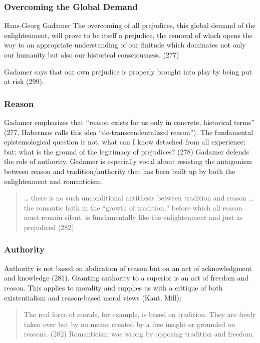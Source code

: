 \documentclass[xcolor=dvipsnames]{beamer}
\begin{document}
\begin{frame}
  \frametitle{Overcoming the Global Demand}
  \begin{block}{Hans-Georg Gadamer}
    The overcoming of all prejudices, this global demand of the
    enlightenment, will prove to be itself a prejudice, the removal of
    which opens the way to an appropriate understanding of our
    finitude which dominates not only our humanity but also our
    historical consciousness. (277)
  \end{block}
Gadamer says that our own prejudice is properly brought into play by
being put at risk (299).
\end{frame}

\begin{frame}
  \frametitle{Reason}
  Gadamer emphasizes that ``reason exists for us only in concrete,
  historical terms'' (277, Habermas calls this idea
  ``de-transcendentalized reason''). The fundamental epistemological
  question is not, what can I know detached from all experience; but:
  what is the ground of the legitimacy of prejudices? (278) Gadamer
  defends the role of authority. Gadamer is especially vocal about
  resisting the antagonism between reason and tradition/authority that
  has been built up by both the enlightenment and romanticism.
  \begin{quote}
    {\ldots} there is no such unconditional antithesis between
    tradition and reason {\ldots} the romantic faith in the ``growth
    of tradition,'' before which all reason must remain silent, is
    fundamentally like the enlightenment and just as prejudiced (282)
  \end{quote}
\end{frame}

\begin{frame}
  \frametitle{Authority}
  Authority is not based on abdication of reason but on an act of
  acknowledgment and knowledge (281). Granting authority to a superior
  is an act of freedom and reason. This applies to morality and
  supplies us with a critique of both existentialism and reason-based
  moral views (Kant, Mill):
  \begin{quote}
    The real force of morals, for example, is based on tradition. They
    are freely taken over but by no means created by a free insight or
    grounded on reasons. (282) Romanticism was wrong by opposing
    tradition and freedom.
  \end{quote}
\end{frame}
\end{document}
